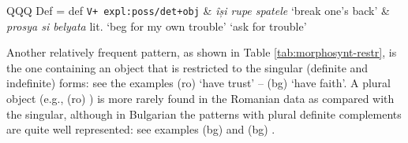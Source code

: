 \documentclass[output=paper,colorlinks,citecolor=brown]{langscibook}
\begin{document}
\begin{table}
\begin{tabularx}{\textwidth}{QQQ}
Def = def \newline \texttt{V+ \newline expl:poss/det+obj} & \textit{își rupe spatele} \newline `break one's back'  & \textit{prosya si belyata} \newline lit. `beg for my own trouble' \newline  `ask for trouble' \\

\lspbottomrule
\end{tabularx}
\caption{The most frequent morphosyntactic restrictions on dependents found with VMWEs in Bulgarian and/or Romanian (literal translation is provided only when it differs from the English equivalent)%
.} 
\label{tab:morphosynt-restr} 
\end{table}



Another relatively frequent pattern, as shown in Table \ref{tab:morphosynt-restr}, is the one containing an object that is restricted to the singular (definite and indefinite) forms: see the examples (ro)  {`have trust'} -- (bg)  {`have faith'}. A plural object (e.g., (ro) ) is more rarely found in the Romanian data as compared with the singular, although in Bulgarian the patterns with plural definite complements are quite well represented: see examples (bg)  and (bg) .  
\end{document}
